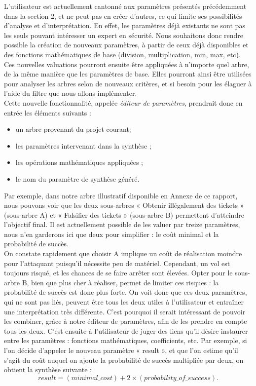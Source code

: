 			L'utilisateur est actuellement cantonné aux paramètres présentés précédemment dans la section 2, et ne peut pas en créer d'autres, ce qui limite ses possibilités d'analyse et d'interprétation. En effet, les paramètres déjà existants ne sont pas les seuls pouvant intéresser un expert en sécurité. Nous souhaitons donc rendre possible la création de nouveaux paramètres, à partir de ceux déjà disponibles et des fonctions mathématiques de base (division, multiplication, min, max, etc). Ces nouvelles valuations pourront ensuite être appliquées à n'importe quel arbre, de la même manière que les paramètres de base. Elles pourront ainsi être utilisées pour analyser les arbres selon de nouveaux critères, et si besoin pour les élaguer à l'aide du filtre que nous allons implémenter.\\

			Cette nouvelle fonctionnalité, appelée \emph{éditeur de paramètres}, prendrait donc en entrée les éléments suivants :
			\begin{itemize}
				\item un arbre provenant du projet courant; %
				\item les paramètres intervenant dans la synthèse ;
				\item les opérations mathématiques appliquées ;
				\item le nom du paramètre de synthèse généré.
			\end{itemize}

			Par exemple, dans notre arbre illustratif disponible en Annexe de ce rapport, nous pouvons voir que les deux sous-arbres « Obtenir illégalement des tickets » (sous-arbre A) et « Falsifier des tickets » (sous-arbre B) permettent d'atteindre l'objectif final. Il est actuellement possible de les valuer par treize paramètres, nous n'en garderons ici que deux pour simplifier : le coût minimal et la probabilité de succès.\\ %

			On constate rapidement que choisir A implique un coût de réalisation moindre pour l'attaquant puisqu'il nécessite peu de matériel. Cependant, un vol est toujours risqué, et les chances de se faire arrêter sont élevées. Opter pour le sous-arbre B, bien que plus cher à réaliser, permet de limiter ces risques : la probabilité de succès est donc plus forte. On voit donc que ces deux paramètres, qui ne sont pas liés, peuvent être tous les deux utiles à l'utilisateur et entraîner une interprétation très différente. C'est pourquoi il serait intéressant de pouvoir les combiner, grâce à notre éditeur de paramètres, afin de les prendre en compte tous les deux. C'est ensuite à l'utilisateur de juger des liens qu'il désire instaurer entre les paramètres : fonctions mathématiques, coefficients, etc. Par exemple, si l'on décide d'appeler le nouveau paramètre « result », et que l'on estime qu'il s'agit du coût auquel on ajoute la probabilité de succès multipliée par deux, on obtient la synthèse suivante : \[ result = (minimal\_cost) + 2 \times (probability\_of\_success).\]
